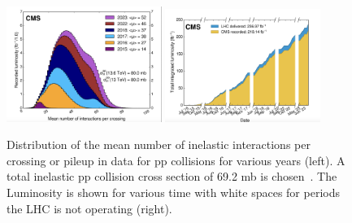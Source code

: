 \begin{figure}[tbp!]
\begin{center}
\includegraphics[angle=0,width=0.45\textwidth]{fig/PileupAcrossTheYears.png}
\includegraphics[angle=0,width=0.45\textwidth]{fig/LuminosityAcrossTheYears.png}
\end{center}
\caption{Distribution of the mean number of inelastic interactions per crossing or pileup in data
for pp collisions for various years (left). A total inelastic pp collision
cross section of 69.2 mb is chosen~\cite{CMS:2020ebo}. The Luminosity is shown for various time with white spaces for periods the LHC is not operating (right).}
\label{fig:LHCBeam}
\end{figure}






%
%





